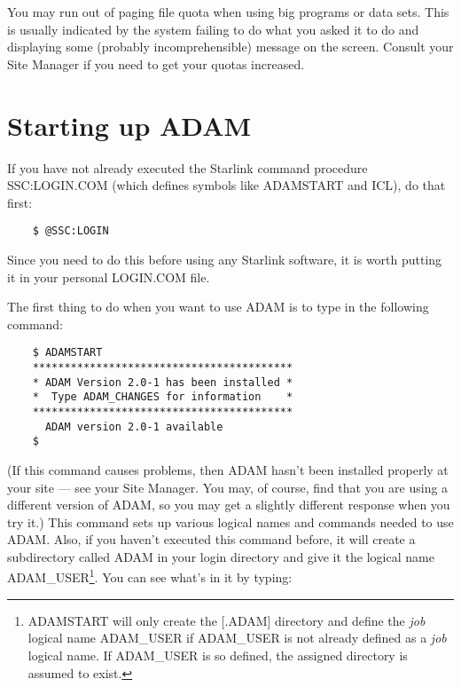 You may run out of paging file quota when using big programs or data sets.
This is usually indicated by the system failing to do what you asked it to do
and displaying some (probably incomprehensible) message on the screen.
Consult your Site Manager if you need to get your quotas increased.

\section{Starting up ADAM}
\label{S_startadam}

If you have not already executed the Starlink command procedure SSC:LOGIN.COM
(which defines symbols like ADAMSTART and ICL), do that first:

\begin{small}
\begin{verbatim}
    $ @SSC:LOGIN
\end{verbatim}
\end{small}

Since you need to do this before using any Starlink software, it is worth
putting it in your personal LOGIN.COM file.

The first thing to do when you want to use ADAM is to type in the following
command:

\begin{small}
\begin{verbatim}
    $ ADAMSTART
    *****************************************
    * ADAM Version 2.0-1 has been installed *
    *  Type ADAM_CHANGES for information    *
    *****************************************
      ADAM version 2.0-1 available
    $
\end{verbatim}
\end{small}

(If this command causes problems, then ADAM hasn't been installed properly at
your site --- see your Site Manager.
You may, of course, find that you are using a different version of ADAM, so you
may get a slightly different response when you try it.)
This command sets up various logical names and commands needed to use ADAM.
Also, if you haven't executed this command before, it will create a subdirectory
called ADAM in your login directory and give it the logical name
ADAM\_USER\footnote{
ADAMSTART will only create the [.ADAM] directory and define the {\em job}
logical name ADAM\-\_USER if ADAM\-\_USER is not already defined as a
{\em job} logical name.
If ADAM\_USER is so defined, the assigned directory is assumed to exist.}.
You can see what's in it by typing:

